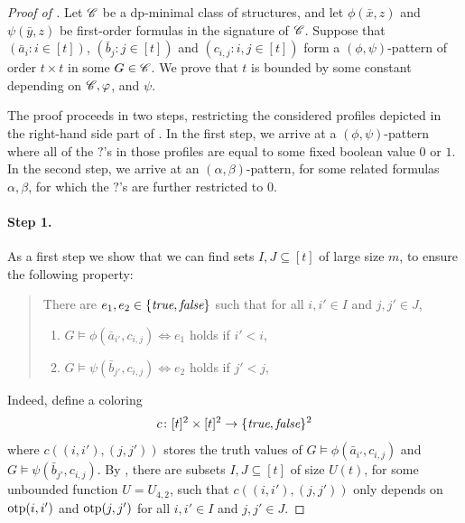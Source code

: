 \begin{proof}[Proof of ]
    Let $\mathscr C$ be a dp-minimal class of structures, and let $\phi(\bar x,z)$ and $\psi(\bar y,z)$ be first-order formulas in the signature of $\mathscr C$.
Suppose that
$(\bar a_i:i\in [t])$,
$(\bar b_j:j\in [t])$ and $(c_{i,j}:i,j\in[t])$ form a $(\phi,\psi)$-pattern of order $t\times t$ in some $G\in\mathscr C$. We prove that $t$ is bounded by some constant depending on $\mathscr C,\varphi$, and $\psi$.

The proof proceeds in two steps, restricting the considered profiles depicted in the right-hand side part of .
In the first step, we arrive at a $(\phi,\psi)$-pattern where all of the $?$'s in those profiles are equal to some fixed boolean value $0$ or $1$. In the second step, we 
arrive at an $(\alpha,\beta)$-pattern, for some related formulas $\alpha,\beta$,
for which the $?$'s are further restricted to $0$.

\paragraph{Step 1.}
As a first step we show that
we can find sets $I,J\subseteq [t]$ of large size $m$, to ensure the following property:

\begin{quote}
There are $e_1,e_2\in\{\textit{true},\textit{false}\}$
 such that for all $i,i'\in I$ and $j,j'\in J$,

\begin{enumerate}[start=3]
    \item $G\models\phi(\bar a_{i'},c_{i,j})\Leftrightarrow e_1$ holds if $i'<i$,
    \item $G\models\psi(\bar b_{j'},c_{i,j})\Leftrightarrow e_2$ holds if $j'<j$,
\end{enumerate}
\end{quote}
 

\noindent Indeed, 
define a coloring 
$$c\colon [t]^2\times [t]^2\to \{\textit{true},\textit{false}\}^2$$
where $c((i,i'),(j,j'))$ 
stores the truth values of
$G\models\phi(\bar a_{i'},c_{i,j})$
and 
$G\models\psi(\bar b_{j'},c_{i,j})$.
By , there are subsets $I,J\subseteq [t]$ 
of size $U(t)$, for some unbounded function $U=U_{4,2}$,
such that 
$c((i,i'),(j,j'))$ only depends on $\mathrm{otp}(i,i')$ and $\mathrm{otp}(j,j')$
for all $i,i'\in I$ and $j,j'\in J$.


\end{proof}
